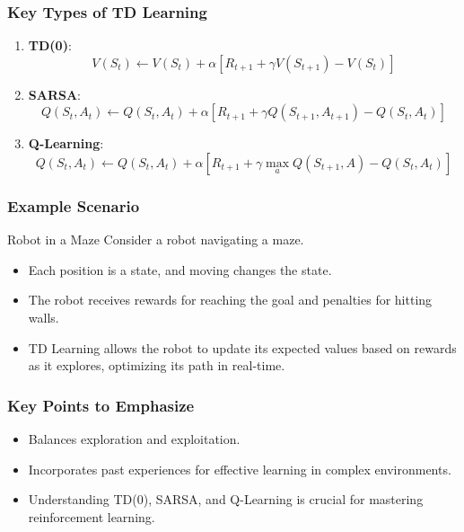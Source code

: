 \documentclass[aspectratio=169]{beamer}
\begin{document}
\begin{frame}[fragile]
    \frametitle{Key Types of TD Learning}
    \begin{enumerate}
        \item \textbf{TD(0)}:
            \begin{equation}
                V(S_t) \leftarrow V(S_t) + \alpha [R_{t+1} + \gamma V(S_{t+1}) - V(S_t)]
            \end{equation}
        
        \item \textbf{SARSA}:
            \begin{equation}
                Q(S_t, A_t) \leftarrow Q(S_t, A_t) + \alpha [R_{t+1} + \gamma Q(S_{t+1}, A_{t+1}) - Q(S_t, A_t)]
            \end{equation}
        
        \item \textbf{Q-Learning}:
            \begin{equation}
                Q(S_t, A_t) \leftarrow Q(S_t, A_t) + \alpha [R_{t+1} + \gamma \max_a Q(S_{t+1}, A) - Q(S_t, A_t)]
            \end{equation}
    \end{enumerate}
\end{frame}

\begin{frame}[fragile]
    \frametitle{Example Scenario}
    \begin{block}{Robot in a Maze}
        Consider a robot navigating a maze.
        \begin{itemize}
            \item Each position is a state, and moving changes the state.
            \item The robot receives rewards for reaching the goal and penalties for hitting walls.
            \item TD Learning allows the robot to update its expected values based on rewards as it explores, optimizing its path in real-time.
        \end{itemize}
    \end{block}
\end{frame}

\begin{frame}[fragile]
    \frametitle{Key Points to Emphasize}
    \begin{itemize}
        \item Balances exploration and exploitation.
        \item Incorporates past experiences for effective learning in complex environments.
        \item Understanding TD(0), SARSA, and Q-Learning is crucial for mastering reinforcement learning.
    \end{itemize}
\end{frame}
\end{document}
